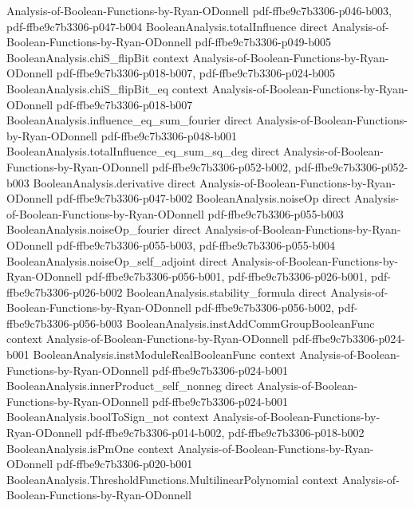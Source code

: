 \begin{theorem}
  {Analysis-of-Boolean-Functions-by-Ryan-ODonnell}
  {pdf-ffbe9c7b3306-p046-b003,
    pdf-ffbe9c7b3306-p047-b004}
\proofstep
  {BooleanAnalysis.totalInfluence}
  {direct}
  {Analysis-of-Boolean-Functions-by-Ryan-ODonnell}
  {pdf-ffbe9c7b3306-p049-b005}
\proofstep
  {BooleanAnalysis.chiS_flipBit}
  {context}
  {Analysis-of-Boolean-Functions-by-Ryan-ODonnell}
  {pdf-ffbe9c7b3306-p018-b007,
    pdf-ffbe9c7b3306-p024-b005}
\proofstep
  {BooleanAnalysis.chiS_flipBit_eq}
  {context}
  {Analysis-of-Boolean-Functions-by-Ryan-ODonnell}
  {pdf-ffbe9c7b3306-p018-b007}
\proofstep
  {BooleanAnalysis.influence_eq_sum_fourier}
  {direct}
  {Analysis-of-Boolean-Functions-by-Ryan-ODonnell}
  {pdf-ffbe9c7b3306-p048-b001}
\proofstep
  {BooleanAnalysis.totalInfluence_eq_sum_sq_deg}
  {direct}
  {Analysis-of-Boolean-Functions-by-Ryan-ODonnell}
  {pdf-ffbe9c7b3306-p052-b002,
    pdf-ffbe9c7b3306-p052-b003}
\proofstep
  {BooleanAnalysis.derivative}
  {direct}
  {Analysis-of-Boolean-Functions-by-Ryan-ODonnell}
  {pdf-ffbe9c7b3306-p047-b002}
\proofstep
  {BooleanAnalysis.noiseOp}
  {direct}
  {Analysis-of-Boolean-Functions-by-Ryan-ODonnell}
  {pdf-ffbe9c7b3306-p055-b003}
\proofstep
  {BooleanAnalysis.noiseOp_fourier}
  {direct}
  {Analysis-of-Boolean-Functions-by-Ryan-ODonnell}
  {pdf-ffbe9c7b3306-p055-b003,
    pdf-ffbe9c7b3306-p055-b004}
\proofstep
  {BooleanAnalysis.noiseOp_self_adjoint}
  {direct}
  {Analysis-of-Boolean-Functions-by-Ryan-ODonnell}
  {pdf-ffbe9c7b3306-p056-b001,
    pdf-ffbe9c7b3306-p026-b001,
    pdf-ffbe9c7b3306-p026-b002}
\proofstep
  {BooleanAnalysis.stability_formula}
  {direct}
  {Analysis-of-Boolean-Functions-by-Ryan-ODonnell}
  {pdf-ffbe9c7b3306-p056-b002,
    pdf-ffbe9c7b3306-p056-b003}
\proofstep
  {BooleanAnalysis.instAddCommGroupBooleanFunc}
  {context}
  {Analysis-of-Boolean-Functions-by-Ryan-ODonnell}
  {pdf-ffbe9c7b3306-p024-b001}
\proofstep
  {BooleanAnalysis.instModuleRealBooleanFunc}
  {context}
  {Analysis-of-Boolean-Functions-by-Ryan-ODonnell}
  {pdf-ffbe9c7b3306-p024-b001}
\proofstep
  {BooleanAnalysis.innerProduct_self_nonneg}
  {direct}
  {Analysis-of-Boolean-Functions-by-Ryan-ODonnell}
  {pdf-ffbe9c7b3306-p024-b001}
\proofstep
  {BooleanAnalysis.boolToSign_not}
  {context}
  {Analysis-of-Boolean-Functions-by-Ryan-ODonnell}
  {pdf-ffbe9c7b3306-p014-b002,
    pdf-ffbe9c7b3306-p018-b002}
\proofstep
  {BooleanAnalysis.isPmOne}
  {context}
  {Analysis-of-Boolean-Functions-by-Ryan-ODonnell}
  {pdf-ffbe9c7b3306-p020-b001}
\proofstep
  {BooleanAnalysis.ThresholdFunctions.MultilinearPolynomial}
  {context}
  {Analysis-of-Boolean-Functions-by-Ryan-ODonnell}

\end{theorem}
